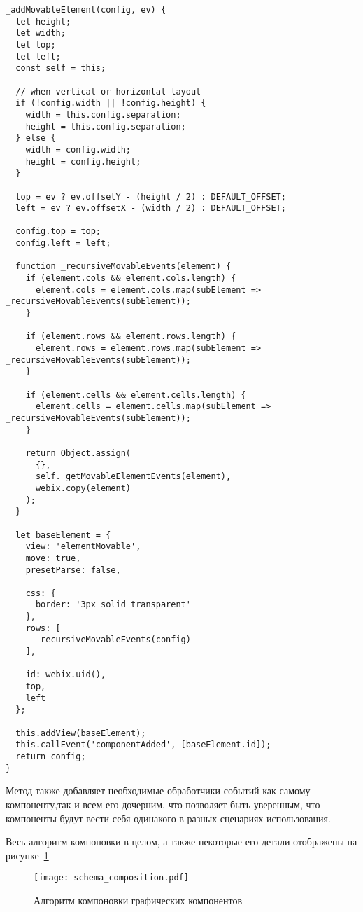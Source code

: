 \begin{lstlisting}
_addMovableElement(config, ev) {
  let height;
  let width;
  let top;
  let left;
  const self = this;

  // when vertical or horizontal layout
  if (!config.width || !config.height) {
    width = this.config.separation;
    height = this.config.separation;
  } else {
    width = config.width;
    height = config.height;
  }

  top = ev ? ev.offsetY - (height / 2) : DEFAULT_OFFSET;
  left = ev ? ev.offsetX - (width / 2) : DEFAULT_OFFSET;

  config.top = top;
  config.left = left;

  function _recursiveMovableEvents(element) {
    if (element.cols && element.cols.length) {
      element.cols = element.cols.map(subElement => _recursiveMovableEvents(subElement));
    }

    if (element.rows && element.rows.length) {
      element.rows = element.rows.map(subElement => _recursiveMovableEvents(subElement));
    }

    if (element.cells && element.cells.length) {
      element.cells = element.cells.map(subElement => _recursiveMovableEvents(subElement));
    }

    return Object.assign(
      {},
      self._getMovableElementEvents(element),
      webix.copy(element)
    );
  }

  let baseElement = {
    view: 'elementMovable',
    move: true,
    presetParse: false,

    css: {
      border: '3px solid transparent'
    },
    rows: [
      _recursiveMovableEvents(config)
    ],

    id: webix.uid(),
    top,
    left
  };

  this.addView(baseElement);
  this.callEvent('componentAdded', [baseElement.id]);
  return config;
}
\end{lstlisting}

Метод также добавляет необходимые обработчики событий как самому компоненту,так и всем его дочерним, что позволяет быть уверенным, что компоненты будут вести себя одинакого в разных сценариях использования.

Весь алгоритм компоновки в целом, а также некоторые его детали отображены на рисунке~\ref{sec:dev:composition}\pagebreak

\begin{figure}[ht]
  \centering
    \texttt{[image: schema\_composition.pdf]}
    \caption{Алгоритм компоновки графических компонентов}
    \label{sec:dev:composition}
\end{figure}